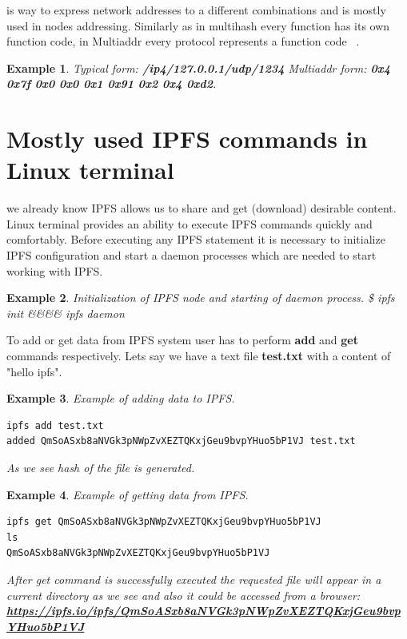 \documentclass[a4paper,12pt,fleqn]{article}
\newtheorem{exmp}{Example}[subsection]
\begin{document}
 is way to express network addresses to a different combinations and is mostly used in nodes addressing. Similarly as in multihash every function has its own function code, in Multiaddr every protocol represents a function code ~\cite{multiaddr}.

\begin{exmp}
Typical form: \newline \textbf{/ip4/127.0.0.1/udp/1234}\newline
Multiaddr form: \newline \textbf{0x4 0x7f 0x0 0x0 0x1 0x91 0x2 0x4 0xd2}.
\end{exmp}

\section{Mostly used IPFS commands in Linux terminal}

 we already know IPFS allows us to share and get (download) desirable content. Linux terminal provides an ability to execute IPFS commands quickly and comfortably. Before executing any IPFS statement it is necessary to initialize IPFS configuration and start a daemon processes which are needed to start working with IPFS.

\begin{exmp} Initialization of IPFS node and starting of daemon process.
\newline
\$ ipfs init \&&\&& ipfs daemon
\end{exmp}


To add or get data from IPFS system user has to perform \textbf{add} and \textbf{get} commands respectively. Lets say we have a text file \textbf{test.txt} with a content of "hello ipfs".


\begin{exmp} Example of adding data to IPFS.
\begin{lstlisting}[caption={Adding data to IPFS.},label={abc}]
ipfs add test.txt
added QmSoASxb8aNVGk3pNWpZvXEZTQKxjGeu9bvpYHuo5bP1VJ test.txt
\end{lstlisting}
As we see hash of the file is generated.
\end{exmp}

\begin{exmp} Example of getting data from IPFS.

\begin{lstlisting}[caption={Getting data from IPFS.},label={abc}]
ipfs get QmSoASxb8aNVGk3pNWpZvXEZTQKxjGeu9bvpYHuo5bP1VJ
ls
QmSoASxb8aNVGk3pNWpZvXEZTQKxjGeu9bvpYHuo5bP1VJ
\end{lstlisting}
After get command is successfully executed the requested file will appear in a current directory as we see and also it could be accessed from a browser: 
\newline
\textbf{\url{https://ipfs.io/ipfs/QmSoASxb8aNVGk3pNWpZvXEZTQKxjGeu9bvpYHuo5bP1VJ}}
\end{exmp}
\end{document}
